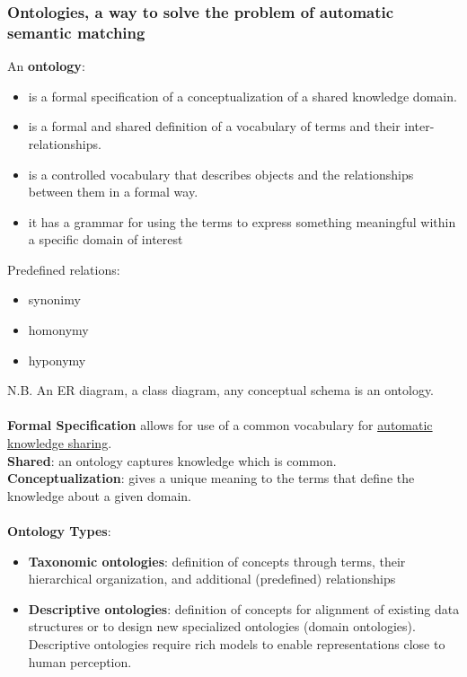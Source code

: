 \documentclass[10pt,a4paper]{article}
\newcommand{\nline}{\\~\\}
\begin{document}
\subsubsection{Ontologies, a way to solve the problem of automatic semantic matching}
An \textbf{ontology}:
\begin{itemize}
	\item is a formal specification of a conceptualization of a shared knowledge domain. 
	\item is a formal and shared definition of a vocabulary of terms and their inter-relationships. 
	\item is a controlled vocabulary that describes objects and the relationships between them in a formal way. 
	\item it has a grammar for using the terms to express something meaningful within a specific domain of interest
\end{itemize} 
Predefined relations: 
\begin{itemize}
	\item synonimy
	\item homonymy
	\item hyponymy
\end{itemize} 
N.B. An ER diagram, a class diagram, any conceptual schema is an ontology. \nline
\textbf{Formal Specification} allows for use of a common vocabulary for \uline{automatic knowledge sharing}. \\
\textbf{Shared}: an ontology captures knowledge which is common. \\
\textbf{Conceptualization}: gives a unique meaning to the terms that define the knowledge about a given domain. \nline

\textbf{Ontology Types}:
\begin{itemize}
	\item \textbf{Taxonomic ontologies}: definition of concepts through terms, their hierarchical organization, and additional (predefined) relationships
	\item \textbf{Descriptive ontologies}: definition of concepts for alignment of existing data structures or to design new specialized ontologies (domain ontologies). Descriptive ontologies require rich models to enable representations close to human perception.
\end{itemize}
\end{document}
